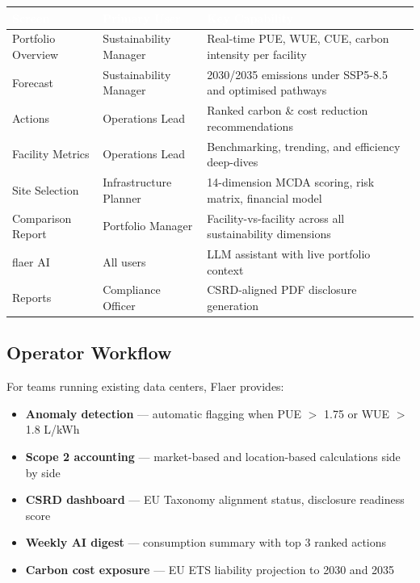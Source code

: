 \documentclass[11pt, a4paper]{article}
\newcommand{\tableheader}[1]{\cellcolor{flaergreen!90}\textcolor{white}{\textbf{\small #1}}}
\begin{document}
\vspace{0.3cm}
\begin{tabular}{p{3cm} p{3.2cm} p{7.8cm}}
  \toprule
  \tableheader{Screen} & \tableheader{Primary User} & \tableheader{Key Capability} \\
  \midrule
  Portfolio Overview & Sustainability Manager & Real-time PUE, WUE, CUE, carbon intensity per facility \\
  \rowcolor{rowalt} Forecast & Sustainability Manager & 2030/2035 emissions under SSP5-8.5 and optimised pathways \\
  Actions & Operations Lead & Ranked carbon \& cost reduction recommendations \\
  \rowcolor{rowalt} Facility Metrics & Operations Lead & Benchmarking, trending, and efficiency deep-dives \\
  Site Selection & Infrastructure Planner & 14-dimension MCDA scoring, risk matrix, financial model \\
  \rowcolor{rowalt} Comparison Report & Portfolio Manager & Facility-vs-facility across all sustainability dimensions \\
  flaer AI & All users & LLM assistant with live portfolio context \\
  \rowcolor{rowalt} Reports & Compliance Officer & CSRD-aligned PDF disclosure generation \\
  \bottomrule
\end{tabular}

\subsection{Operator Workflow}

For teams running existing data centers, Flaer provides:

\begin{itemize}[leftmargin=1.4em]
  \item \textbf{Anomaly detection} — automatic flagging when PUE $>$ 1.75 or WUE $>$ 1.8 L/kWh
  \item \textbf{Scope 2 accounting} — market-based and location-based calculations side by side
  \item \textbf{CSRD dashboard} — EU Taxonomy alignment status, disclosure readiness score
  \item \textbf{Weekly AI digest} — consumption summary with top 3 ranked actions
  \item \textbf{Carbon cost exposure} — EU ETS liability projection to 2030 and 2035
\end{itemize}
\end{document}
